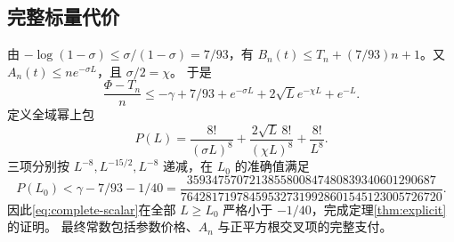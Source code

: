 \documentclass[UTF8,a4paper,11pt,fontset=fandol]{ctexart}
\theoremstyle{remark}
\begin{document}
\subsection{完整标量代价}\label{subsec:complete-scalar}
由 $-\log(1-\sigma)\le\sigma/(1-\sigma)=7/93$，有 $B_n(t)\le T_n+(7/93)n+1$。又 $A_n(t)\le ne^{-\sigma L}$，且 $\sigma/2=\chi$。
于是
\begin{equation}\label{eq:complete-scalar}
 \frac{\Phi-T_n}{n}\le-\gamma+7/93+e^{-\sigma L}
       +2\sqrt L e^{-\chi L}+e^{-L}.
\end{equation}
定义全域幂上包
\[
 P(L)=\frac{8!}{(\sigma L)^8}
       +\frac{2\sqrt L\,8!}{(\chi L)^8}+\frac{8!}{L^8}.
\]
三项分别按 $L^{-8},L^{-15/2},L^{-8}$ 递减，在 $L_0$ 的准确值满足
\begin{equation}\label{eq:scalar-slack}
 P(L_0)<\gamma-7/93-1/40
 =\frac{3593475707213855800847480839340601290687}
 {764281719784595327319928601545123005726720}.
\end{equation}
因此\eqref{eq:complete-scalar}在全部 $L\ge L_0$ 严格小于 $-1/40$，完成定理\ref{thm:explicit}的证明。
最终常数包括参数价格、$A_n$ 与正平方根交叉项的完整支付。
\end{document}
